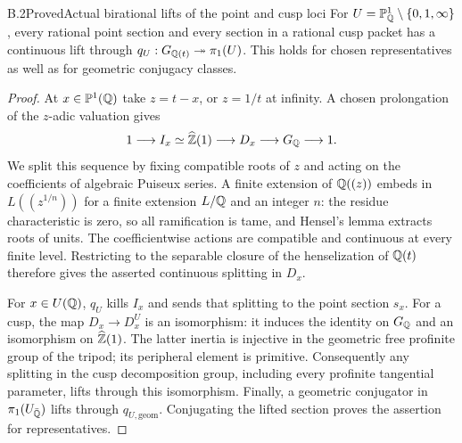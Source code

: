 \begin{statement}{B.2}{Proved}{Actual birational lifts of the point and cusp loci}
For $U=\mathbb P^1_\mathbb Q\setminus\{0,1,\infty\}$, every rational point section
and every section in a rational cusp packet has a continuous lift
through $q_U:G_{\mathbb Q(t)}\twoheadrightarrow\pi_1(U)$.  This holds for
chosen representatives as well as for geometric conjugacy classes.
\end{statement}
\begin{proof}
At $x\in\mathbb P^1(\mathbb Q)$ take $z=t-x$, or $z=1/t$ at infinity.  A chosen
prolongation of the $z$-adic valuation gives
\[
 1\longrightarrow I_x\simeq\widehat{\mathbb Z}(1)
 \longrightarrow D_x\longrightarrow G_\mathbb Q\longrightarrow1.
\]
We split this sequence by fixing compatible roots of $z$ and acting
on the coefficients of algebraic Puiseux series.  A finite extension
of $\mathbb Q((z))$ embeds in $L((z^{1/n}))$ for a finite extension $L/\mathbb Q$
and an integer $n$: the residue characteristic is zero, so all
ramification is tame, and Hensel's lemma extracts roots of units.
The coefficientwise actions are compatible and continuous at every
finite level.  Restricting to the separable closure of the henselization
of $\mathbb Q(t)$ therefore gives the asserted continuous splitting in $D_x$.

For $x\in U(\mathbb Q)$, $q_U$ kills $I_x$ and sends that splitting to
the point section $s_x$.  For a cusp, the map
$D_x\to D_x^U$ is an isomorphism: it induces the identity on $G_\mathbb Q$
and an isomorphism on $\widehat{\mathbb Z}(1)$.  The latter inertia is injective
in the geometric free profinite group of the tripod; its peripheral
element is primitive.  Consequently any splitting in the cusp
decomposition group, including every profinite tangential parameter,
lifts through this isomorphism.  Finally, a geometric conjugator
in $\pi_1(U_{\bar{\mathbb Q}})$ lifts through $q_{U,\mathrm{geom}}$.
Conjugating the lifted section proves the assertion for representatives.
\end{proof}

